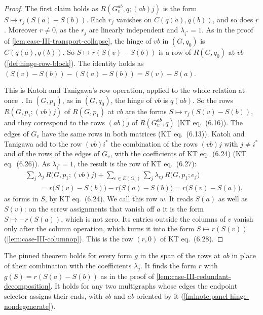 \begin{proof}
  \leanok
  The first claim holds as $R(G_v^{ab}, q; (ab)j)$ is the form
  $S \mapsto r_j(S(a) - S(b))$. Each $r_j$ vanishes on $C(q(a), q(b))$,
  and so does $r$. Moreover $r \neq 0$, as the $r_j$ are linearly
  independent and $\lambda_{i^*} = 1$. As in the proof of
  \cref{lem:case-III-transport-collapse}, the hinge of $vb$ in
  $(G, q_0)$ is $C(q(a), q(b))$. So $S \mapsto r(S(v) - S(b))$ is a row
  of $R(G, q_0)$ at $vb$ (\cref{def:hinge-row-block}). The identity holds
  as $(S(v) - S(b)) - (S(a) - S(b)) = S(v) - S(a)$.

  This is Katoh and Tanigawa's row operation, applied to the whole
  relation at once~\cite[pp.~685--686]{katohTanigawa2011}. In $(G, p_1)$,
  as in $(G, q_0)$, the hinge of $vb$ is $q(ab)$. So the rows
  $R(G, p_1; (vb)j)$ of $R(G, p_1)$ at $vb$ are the forms
  $S \mapsto r_j(S(v) - S(b))$, and they correspond to the rows $(ab)j$
  of $R(G_v^{ab}, q)$ (KT eq.~(6.16)). The edges of $G_v$ have the same
  rows in both matrices (KT eq.~(6.13)). Katoh and Tanigawa add to the
  row $(vb)i^*$ the combination of the rows $(vb)j$ with $j \neq i^*$ and
  of the rows of the edges of $G_v$, with the coefficients of KT
  eq.~(6.24) (KT eq.~(6.26)). As $\lambda_{i^*} = 1$, the result is the
  row of KT eq.~(6.27):
  \begin{align*}
    &\sum_j \lambda_j\, R\bigl(G, p_1; (vb)j\bigr)
      + \sum_{e \in E(G_v)} \sum_j \lambda_{ej}\, R\bigl(G, p_1; e_j\bigr) \\
    &\qquad= r\bigl(S(v) - S(b)\bigr) - r\bigl(S(a) - S(b)\bigr)
      = r\bigl(S(v) - S(a)\bigr),
  \end{align*}
  as forms in $S$, by KT eq.~(6.24). We call this row $w$. It reads
  $S(a)$ as well as $S(v)$: on the screw assignments that vanish off
  $a$ it is the form $S \mapsto -r(S(a))$, which is not zero. Its entries
  outside the columns of $v$ vanish only after the column operation,
  which turns it into the form $S \mapsto r(S(v))$
  (\cref{lem:case-III-columnop}). This is the row $(r, 0)$ of KT
  eq.~(6.28).
\end{proof}

\begin{fmlnote}
  The pinned theorem holds for every form $g$ in the span of the rows at
  $ab$ in place of their combination with the coefficients $\lambda_j$.
  It finds the form $r$ with $g(S) = r(S(a) - S(b))$ as in the proof of
  \cref{lem:case-III-redundant-decomposition}. It holds for any two
  multigraphs whose edges the endpoint selector assigns their ends, with
  $vb$ and $ab$ oriented by it
  (\cref{fmlnote:panel-hinge-nondegenerate}).
\end{fmlnote}

